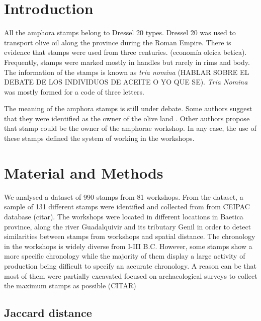 \documentclass[review]{elsarticle}
\begin{document}
\section{Introduction}


All the amphora stamps belong to Dressel 20 types. Dressel 20 was used to transport olive oil along the province during the Roman Empire. There is evidence that stamps were used from three centuries. (economía oleica betica). Frequently, stamps were marked mostly in handles but rarely in rims and body.  
The information of the stamps is known as \textit{tria nomina} (HABLAR SOBRE EL DEBATE DE LOS INDIVIDUOS DE ACEITE O YO QUE SE). \textit{Tria Nomina} was mostly formed for a code of three letters. 

The meaning of the amphora stamps is still under debate. Some authors suggest that they were identified as the owner of the olive land \citep{rodriguez_economioleicola_1977}. Other authors propose that stamp could be the owner of the amphorae workshop. In any case, the use of these stamps defined the system of working in the workshops. 

\section{Material and Methods}

We analysed a dataset of 990 stamps from 81 workshops. From the dataset, a sample of 131 different stamps were identified and collected from from CEIPAC database (citar). The workshops were located in different locations in Baetica province, along the river Guadalquivir and its tributary Genil in order to detect similarities between stamps from workshops and spatial distance. The chronology in the workshops is widely diverse from I-III B.C. However, some stamps show a more specific chronology while the majority of them display a large activity of production being difficult to specify an accurate chronology. A reason can be that most of them were partially excavated focused on archaeological surveys to collect the maximum stamps as possible (CITAR) 



\subsection{Jaccard distance}
\end{document}
